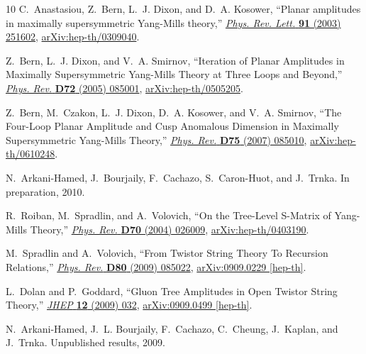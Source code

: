 \documentclass[11pt, reqno]{article}
\begin{document}
\begin{thebibliography}{10}
C.~Anastasiou, Z.~Bern, L.~J. Dixon, and D.~A. Kosower, ``{Planar amplitudes in
  maximally supersymmetric Yang-Mills theory},''
  \href{http://dx.doi.org/10.1103/PhysRevLett.91.251602}{{\em Phys. Rev. Lett.}
  {\bf 91} (2003)  251602},
\href{http://arxiv.org/abs/hep-th/0309040}{{ arXiv:hep-th/0309040}}.

Z.~Bern, L.~J. Dixon, and V.~A. Smirnov, ``{Iteration of Planar Amplitudes in
  Maximally Supersymmetric Yang-Mills Theory at Three Loops and Beyond},''
  \href{http://dx.doi.org/10.1103/PhysRevD.72.085001}{{\em Phys. Rev.} {\bf
  D72} (2005)  085001},
\href{http://arxiv.org/abs/hep-th/0505205}{{ arXiv:hep-th/0505205}}.

Z.~Bern, M.~Czakon, L.~J. Dixon, D.~A. Kosower, and V.~A. Smirnov, ``{The
  Four-Loop Planar Amplitude and Cusp Anomalous Dimension in Maximally
  Supersymmetric Yang-Mills Theory},''
  \href{http://dx.doi.org/10.1103/PhysRevD.75.085010}{{\em Phys. Rev.} {\bf
  D75} (2007)  085010},
\href{http://arxiv.org/abs/hep-th/0610248}{{ arXiv:hep-th/0610248}}.

N.~Arkani-Hamed, J.~Bourjaily, F.~Cachazo, S.~Caron-Huot, and J.~Trnka. In
  preparation, 2010.

R.~Roiban, M.~Spradlin, and A.~Volovich, ``{On the Tree-Level S-Matrix of
  Yang-Mills Theory},''
  \href{http://dx.doi.org/10.1103/PhysRevD.70.026009}{{\em Phys. Rev.} {\bf
  D70} (2004)  026009},
\href{http://arxiv.org/abs/hep-th/0403190}{{ arXiv:hep-th/0403190}}.

M.~Spradlin and A.~Volovich, ``{From Twistor String Theory To Recursion
  Relations},'' \href{http://dx.doi.org/10.1103/PhysRevD.80.085022}{{\em Phys.
  Rev.} {\bf D80} (2009)  085022},
\href{http://arxiv.org/abs/0909.0229}{{ arXiv:0909.0229 [hep-th]}}.

L.~Dolan and P.~Goddard, ``{Gluon Tree Amplitudes in Open Twistor String
  Theory},'' \href{http://dx.doi.org/10.1088/1126-6708/2009/12/032}{{\em JHEP}
  {\bf 12} (2009)  032},
\href{http://arxiv.org/abs/0909.0499}{{ arXiv:0909.0499 [hep-th]}}.

N.~Arkani-Hamed, J.~L. Bourjaily, F.~Cachazo, C.~Cheung, J.~Kaplan, and
  J.~Trnka. Unpublished results, 2009.


\end{thebibliography}
\end{document}
